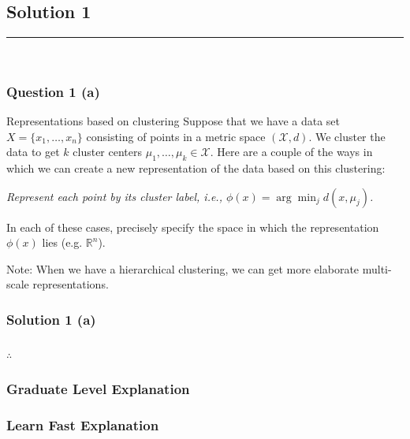 \documentclass{article}
\begin{document}
\pagestyle{fancy}

\subsection*{Solution 1}
\noindent\rule{\textwidth}{0.4pt}\\
\subsubsection*{Question 1 (a)}
\begin{flushleft}
    Representations based on clustering Suppose that we have a data set $X=\{x_1, \ldots, x_n\}$ consisting of points in a metric space $(\mathcal{X}, d)$. We cluster the data to get $k$ cluster centers $\mu_1, \ldots, \mu_k \in \mathcal{X}$. Here are a couple of the ways in which we can create a new representation of the data based on this clustering:
\end{flushleft}
\begin{flushleft}
    \textit{Represent each point by its cluster label, i.e., $\phi(x) = \arg \min_j d(x, \mu_j)$.}
\end{flushleft}
\begin{flushleft}
    In each of these cases, precisely specify the space in which the representation $\phi(x)$ lies (e.g. $\mathbb{R}^n$).

Note: When we have a hierarchical clustering, we can get more elaborate multi-scale representations.
\end{flushleft}

\subsubsection*{Solution 1 (a)}

\subsubsection*{\normalfont}{$\therefore$ }

\subsubsection*{Graduate Level Explanation}

\subsubsection*{Learn Fast Explanation}
\end{document}
